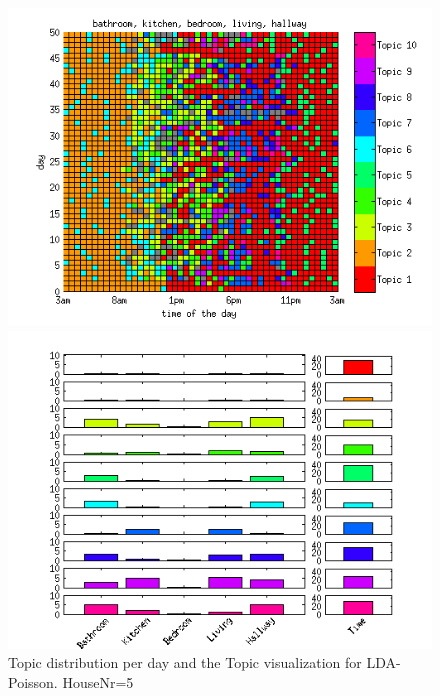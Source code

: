 \begin{figure}
 \centering
 \begin{minipage}[b]{0.45\linewidth}
  \centering
  \includegraphics[width=\textwidth]{Pictures/Pois/DayHN5TS48k20.png}
 \end{minipage}
 \begin{minipage}[b]{0.45\linewidth}
  \centering
  \includegraphics[width=\textwidth]{Pictures/Pois/TopHN5TS48k20.png}
 \end{minipage}
 \caption{Topic distribution per day and the Topic visualization for LDA-Poisson. HouseNr=5}
\end{figure}

